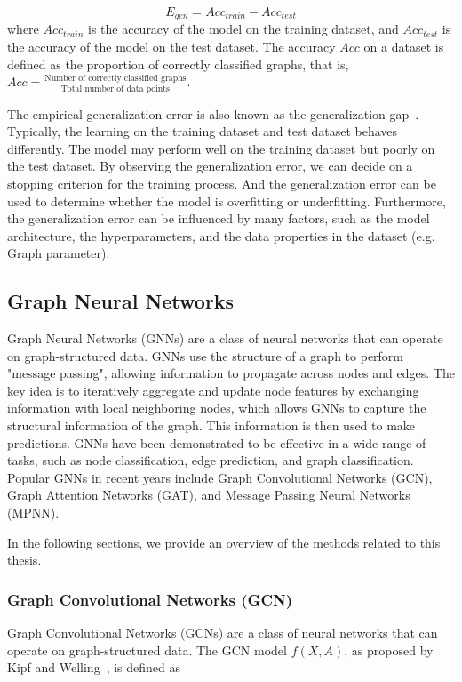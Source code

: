 \documentclass{article}
\begin{document}
$$
    E_{gen} = {Acc_{train}} - {Acc_{test}}
$$
where $Acc_{train}$ is the accuracy of the model on the training dataset, and $Acc_{test}$ is the accuracy of the model on the test dataset. The accuracy $Acc$ on a dataset is defined as the proportion of correctly classified graphs, that is, $Acc = \frac{\text{Number of correctly classified graphs}}{\text{Total number of data points}}$.

The empirical generalization error is also known as the generalization gap~\cite{goodfellow2016deep}. Typically, the learning on the training dataset and test dataset behaves differently. The model may perform well on the training dataset but poorly on the test dataset. By observing the generalization error, we can decide on a stopping criterion for the training process. And the generalization error can be used to determine whether the model is overfitting or underfitting. Furthermore, the generalization error can be influenced by many factors, such as the model architecture, the hyperparameters, and the data properties in the dataset (e.g. Graph parameter). 

\subsection{Graph Neural Networks}
Graph Neural Networks (GNNs) are a class of neural networks that can operate on graph-structured data. GNNs use the structure of a graph to perform "message passing", allowing information to propagate across nodes and edges. The key idea is to iteratively aggregate and update node features by exchanging information with local neighboring nodes, which allows GNNs to capture the structural information of the graph. This information is then used to make predictions. GNNs have been demonstrated to be effective in a wide range of tasks, such as node classification, edge prediction, and graph classification. Popular GNNs in recent years include Graph Convolutional Networks (GCN), Graph Attention Networks (GAT), and Message Passing Neural Networks (MPNN).

In the following sections, we provide an overview of the methods related to this thesis.

\subsubsection{Graph Convolutional Networks (GCN)}

Graph Convolutional Networks (GCNs) are a class of neural networks that can operate on graph-structured data. The GCN model $f(X, A)$, as proposed by Kipf and Welling~\cite{kipf2016semi}, is defined as
\end{document}
